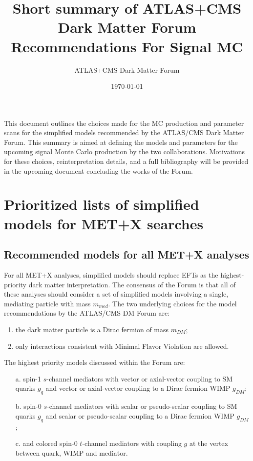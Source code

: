 \documentclass[debug,notitlepage]{dmfm}
\title{Short summary of ATLAS+CMS Dark Matter Forum Recommendations For Signal MC}
\author{ATLAS+CMS Dark Matter Forum}
\date{\today}
\newcommand{\blankpage}{\newpage\hbox{}\thispagestyle{empty}\newpage}
\newcommand{\mdm}{\ensuremath{m_{DM}}\xspace}
\newcommand{\mmed}{\ensuremath{m_{med}}\xspace}
\begin{document}
\setcounter{secnumdepth}{3} %

% 

\maketitle


This document outlines the choices made for the MC production and parameter scans
for the simplified models recommended by the ATLAS/CMS Dark Matter Forum. 
This summary is aimed at defining the models and parameters
for the upcoming signal Monte Carlo production by the two collaborations. 
Motivations for these choices, reinterpretation details, and a full bibliography 
will be provided in the upcoming document concluding the works of the Forum. 

\section{Prioritized lists of simplified models for MET+X searches}

\subsection{Recommended models for all MET+X analyses}
\label{sec:RecommendedModelsAllAnalyses}

For all MET+X analyses, simplified models should replace EFTs as the
highest-priority dark matter interpretation. The consensus of the
Forum is that all of these analyses should consider a set of simplified models involving 
a single, mediating particle with mass \mmed. 
The two underlying choices for the model recommendations by the ATLAS/CMS DM Forum are:
\begin{enumerate}
 \item the dark matter particle is a Dirac fermion of mass \mdm;
 \item only interactions consistent with Minimal Flavor Violation are allowed.
\end{enumerate}

The highest priority models discussed within the Forum are:
\begin{itemize}
\item[a.] spin-1 $s$-channel mediators with vector or 
  axial-vector coupling to SM quarks $g_q$
  and vector or axial-vector coupling to a Dirac fermion WIMP $g_{DM}$;
\item[b.] spin-0 $s$-channel mediators with scalar or 
  pseudo-scalar coupling to SM quarks $g_q$ and scalar or pseudo-scalar
  coupling to a Dirac fermion WIMP $g_{DM}$;
\item[c.] and colored spin-0 $t$-channel mediators with 
  coupling $g$ at the vertex between quark, WIMP 
  and mediator. 
\end{itemize}
\end{document}
